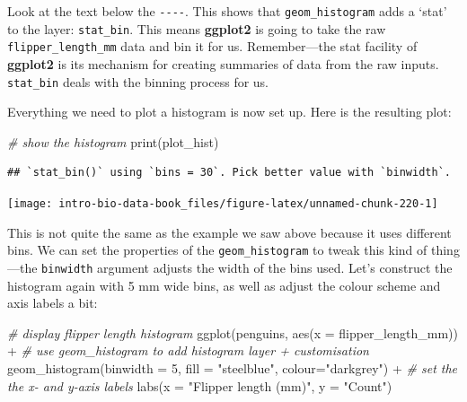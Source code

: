 \documentclass[
]{book}
\newenvironment{Shaded}{\begin{snugshade}}{\end{snugshade}}
\newcommand{\AttributeTok}[1]{\textcolor[rgb]{0.77,0.63,0.00}{#1}}
\newcommand{\CommentTok}[1]{\textcolor[rgb]{0.56,0.35,0.01}{\textit{#1}}}
\newcommand{\DecValTok}[1]{\textcolor[rgb]{0.00,0.00,0.81}{#1}}
\newcommand{\FunctionTok}[1]{\textcolor[rgb]{0.00,0.00,0.00}{#1}}
\newcommand{\NormalTok}[1]{#1}
\newcommand{\SpecialCharTok}[1]{\textcolor[rgb]{0.00,0.00,0.00}{#1}}
\newcommand{\StringTok}[1]{\textcolor[rgb]{0.31,0.60,0.02}{#1}}
\begin{document}
Look at the text below the \texttt{-\/-\/-\/-}. This shows that \texttt{geom\_histogram} adds a `stat' to the layer: \texttt{stat\_bin}. This means \textbf{ggplot2} is going to take the raw \texttt{flipper\_length\_mm} data and bin it for us. Remember---the stat facility of \textbf{ggplot2} is its mechanism for creating summaries of data from the raw inputs. \texttt{stat\_bin} deals with the binning process for us.

Everything we need to plot a histogram is now set up. Here is the resulting plot:

\begin{Shaded}
\begin{Highlighting}[]
\CommentTok{\# show the histogram}
\FunctionTok{print}\NormalTok{(plot\_hist)}
\end{Highlighting}
\end{Shaded}

\begin{verbatim}
## `stat_bin()` using `bins = 30`. Pick better value with `binwidth`.
\end{verbatim}

\begin{center}\texttt{[image: intro-bio-data-book\_files/figure-latex/unnamed-chunk-220-1]} \end{center}

This is not quite the same as the example we saw above because it uses different bins. We can set the properties of the \texttt{geom\_histogram} to tweak this kind of thing---the \texttt{binwidth} argument adjusts the width of the bins used. Let's construct the histogram again with 5 mm wide bins, as well as adjust the colour scheme and axis labels a bit:

\begin{Shaded}
\begin{Highlighting}[]
\CommentTok{\# display flipper length histogram}
\FunctionTok{ggplot}\NormalTok{(penguins, }\FunctionTok{aes}\NormalTok{(}\AttributeTok{x =}\NormalTok{ flipper\_length\_mm)) }\SpecialCharTok{+} 
  \CommentTok{\# use geom\_histogram to add histogram layer + customisation}
  \FunctionTok{geom\_histogram}\NormalTok{(}\AttributeTok{binwidth =} \DecValTok{5}\NormalTok{, }\AttributeTok{fill =} \StringTok{"steelblue"}\NormalTok{, }\AttributeTok{colour=}\StringTok{"darkgrey"}\NormalTok{) }\SpecialCharTok{+} 
  \CommentTok{\# set the the x{-} and y{-}axis labels}
  \FunctionTok{labs}\NormalTok{(}\AttributeTok{x =} \StringTok{"Flipper length (mm)"}\NormalTok{, }\AttributeTok{y =} \StringTok{"Count"}\NormalTok{)}
\end{Highlighting}
\end{Shaded}
\end{document}
